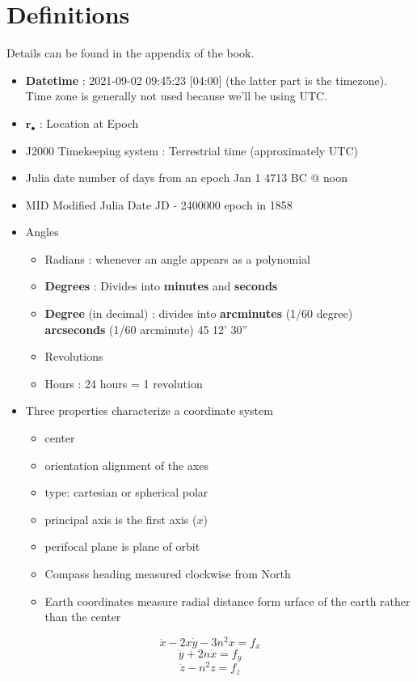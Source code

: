 \let \vec \mathbf
\section{Definitions}
Details can be found in the appendix of the book.
\begin{itemize} 
	\item \textbf{Datetime} : 2021-09-02 09:45:23 [04:00] (the latter part is the timezone). Time zone is generally not used because we'll be using UTC.
	\item $\vec r_\bullet$ : Location at Epoch 
	\item J2000 Timekeeping system : Terrestrial time (approximately UTC)
	\item Julia date number of days from an epoch Jan 1 4713 BC @ noon
	\item MID Modified Julia Date JD - 2400000 epoch in 1858
	\item Angles
	\begin{itemize} 
		\item Radians : whenever an angle appears as a polynomial
		\item \textbf{Degrees} : Divides into \textbf{minutes} and \textbf{seconds}
		\item \textbf{Degree} (in decimal) : divides into \textbf{arcminutes} (1/60 degree) \textbf{arcseconds} (1/60 arcminute) 45 12' 30''
		\item Revolutions 
		\item Hours : 24 hours = 1 revolution
	\end{itemize}
	\item Three properties characterize a coordinate system
	\begin{itemize} 
		\item center
		\item orientation alignment of the axes
		\item type: cartesian or spherical polar
		\item principal axis is the first axis ($x$) 
		\item perifocal plane is plane of orbit
		\item Compass heading measured clockwise from North
		\item Earth coordinates measure radial distance form urface of the earth rather than the center
	\end{itemize}
\end{itemize}


\begin{definition} 
	\[\ddot x -2x\dot y -3n^2x = f_x\]	
	\[\ddot y +2n \dot x = f_y\]	
	\[\ddot z - n^2z = f_z\]	
\end{definition}